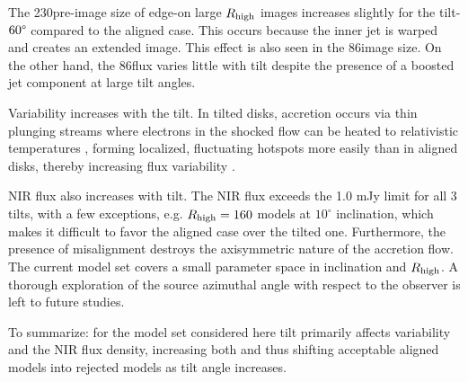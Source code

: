The 230\GHz pre-image size of edge-on large $R_\mathrm{high}$ images increases slightly for the tilt-$60\degree$ compared to the aligned case. This occurs because the inner jet is warped and creates an extended image. This effect is also seen in the 86\GHz image size. On the other hand, the 86\GHz flux varies little with tilt despite the presence of a boosted jet component at large tilt angles.


Variability increases with the tilt. In tilted disks, accretion occurs via thin plunging streams \citep[e.g.,][]{Fragile2007} where electrons in the shocked flow can be heated to relativistic temperatures \citep[e.g.][]{Dexter2013,White2019}, forming localized, fluctuating hotspots more easily than in aligned disks, thereby increasing flux variability \citep{Chatterjee2020}.



NIR flux also increases with tilt.  The NIR flux exceeds the 1.0 mJy limit for all 3 tilts, with a few exceptions, e.g. $R_{\rm high}=160$ models at $10^{\circ}$ inclination, which makes it difficult to favor the aligned case over the tilted one. Furthermore, the presence of misalignment destroys the axisymmetric nature of the accretion flow.  The current model set covers a small parameter space in inclination and $R_{\rm high}$.  A thorough exploration of the source azimuthal angle with respect to the observer is left to future studies.

To summarize: for the model set considered here tilt primarily affects variability and the NIR flux density, increasing both and thus shifting acceptable aligned models into rejected models as tilt angle increases.

